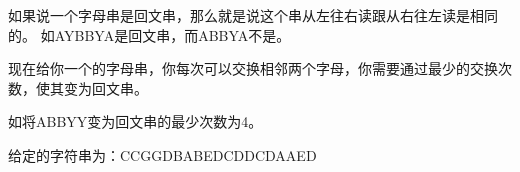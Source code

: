 \vspace{6pt}
\par 
如果说一个字母串是回文串，那么就是说这个串从左往右读跟从右往左读是相同的。
如AYBBYA是回文串，而ABBYA不是。\par
现在给你一个的字母串，你每次可以交换相邻两个字母，你需要通过最少的交换次数，使其变为回文串。\par
如将ABBYY变为回文串的最少次数为4。\par
给定的字符串为：CCGGDBABEDCDDCDAAED
